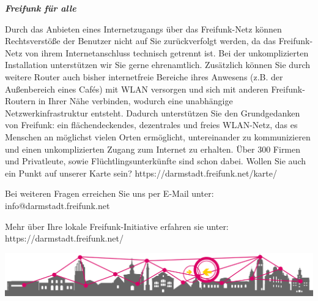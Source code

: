 \documentclass[a4paper]{article}
\begin{document}
\newpage

\thispagestyle{empty}

\begin{center}
  \Huge \textit{\textbf{\textcolor{freifunkpink}{Freifunk für alle}}} \\
  \vspace{0.6cm}
\end{center}

\begin{Row}[cellsep=0.75cm]
  \begin{Cell}{1}
      Durch das Anbieten eines Internetzugangs über das Freifunk-Netz können Rechtsverstöße der Benutzer nicht auf Sie zurückverfolgt werden, da das Freifunk-Netz von ihrem Internetanschluss technisch getrennt ist.
      Bei der unkomplizierten Installation unterstützen wir Sie gerne ehrenamtlich. Zusätzlich können Sie durch weitere Router auch bisher internetfreie Bereiche ihres Anwesens (z.B. der Außenbereich eines Cafés) mit WLAN versorgen und sich mit anderen Freifunk-Routern in Ihrer Nähe verbinden, wodurch eine unabhängige Netzwerkinfrastruktur entsteht. Dadurch unterstützen Sie den Grundgedanken von Freifunk: ein flächendeckendes, dezentrales und freies WLAN-Netz, das es Menschen an möglichst vielen Orten ermöglicht, untereinander zu kommunizieren und einen unkomplizierten Zugang zum Internet zu erhalten. Über 300 Firmen und Privatleute, sowie Flüchtlingsunterkünfte sind schon dabei.
      Wollen Sie auch ein Punkt auf unserer Karte sein? https://darmstadt.freifunk.net/karte/

      \vspace{1cm}


      \begin{center}
        Bei weiteren Fragen erreichen Sie uns per E-Mail unter:\\
        info@darmstadt.freifunk.net

        \vspace{1cm}
        Mehr über Ihre lokale Freifunk-Initiative erfahren sie unter:\\
        \vspace{0.5cm}
        \large https://darmstadt.freifunk.net/
      \end{center}
      \vspace{2cm}


  \end{Cell}
\end{Row}

\vspace{0.8cm}
\begin{center}
  \hspace*{-0.05 \paperwidth}\includegraphics[width=\paperwidth]{../images/footer_skyline_notext.png}
\end{center}
\end{document}
